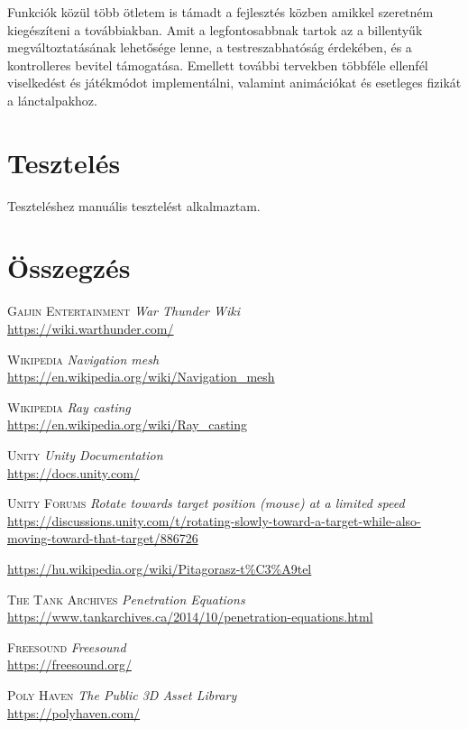 \documentclass[
]{thesis-ekf}
\theoremstyle{definition}
\theoremstyle{remark}
\begin{document}
Funkciók közül több ötletem is támadt a fejlesztés közben amikkel szeretném kiegészíteni a továbbiakban. Amit a legfontosabbnak tartok az a billentyűk megváltoztatásának lehetősége lenne, a testreszabhatóság érdekében, és a kontrolleres bevitel támogatása.
Emellett további tervekben többféle ellenfél viselkedést és játékmódot implementálni, valamint animációkat és esetleges fizikát a lánctalpakhoz.



\chapter{Tesztelés}

Teszteléshez manuális tesztelést alkalmaztam.


\chapter*{Összegzés}




\begin{thebibliography}{55}

    \textsc{Gaijin Entertainment } \emph{War Thunder Wiki} \\
    \url{https://wiki.warthunder.com/}

    \textsc{Wikipedia} \emph{Navigation mesh} \\
    \url{https://en.wikipedia.org/wiki/Navigation_mesh}

    \textsc{Wikipedia} \emph{Ray casting} \\
    \url{https://en.wikipedia.org/wiki/Ray_casting}

    \textsc{Unity} \emph{Unity Documentation} \\
    \url{https://docs.unity.com/}

    \textsc{Unity Forums} \emph{Rotate towards target position (mouse) at a limited speed} \\
    \url{https://discussions.unity.com/t/rotating-slowly-toward-a-target-while-also-moving-toward-that-target/886726}

    \url{https://hu.wikipedia.org/wiki/Pitagorasz-t\%C3\%A9tel}

    \textsc{The Tank Archives} \emph{Penetration Equations} \\
    \url{https://www.tankarchives.ca/2014/10/penetration-equations.html}

    \textsc{Freesound} \emph{Freesound} \\
    \url{https://freesound.org/}


    \textsc{Poly Haven} \emph{The Public 3D Asset Library} \\
    \url{https://polyhaven.com/}

\end{thebibliography}
\end{document}

